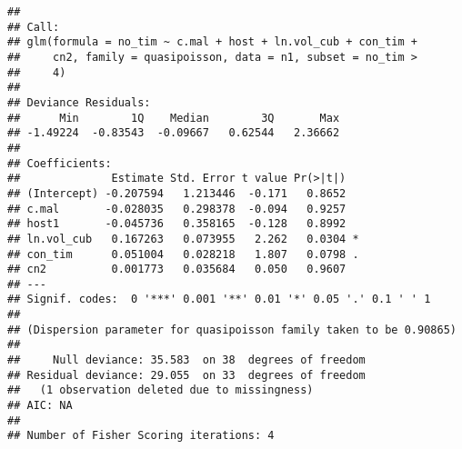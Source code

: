 \documentclass[]{article}
\newenvironment{Shaded}{\begin{snugshade}}{\end{snugshade}}
\newcommand{\KeywordTok}[1]{\textcolor[rgb]{0.13,0.29,0.53}{\textbf{#1}}}
\newcommand{\DataTypeTok}[1]{\textcolor[rgb]{0.13,0.29,0.53}{#1}}
\newcommand{\DecValTok}[1]{\textcolor[rgb]{0.00,0.00,0.81}{#1}}
\newcommand{\FloatTok}[1]{\textcolor[rgb]{0.00,0.00,0.81}{#1}}
\newcommand{\StringTok}[1]{\textcolor[rgb]{0.31,0.60,0.02}{#1}}
\newcommand{\CommentTok}[1]{\textcolor[rgb]{0.56,0.35,0.01}{\textit{#1}}}
\newcommand{\OperatorTok}[1]{\textcolor[rgb]{0.81,0.36,0.00}{\textbf{#1}}}
\newcommand{\NormalTok}[1]{#1}
\begin{document}
\begin{Shaded}
\end{Shaded}

\begin{verbatim}
## 
## Call:
## glm(formula = no_tim ~ c.mal + host + ln.vol_cub + con_tim + 
##     cn2, family = quasipoisson, data = n1, subset = no_tim > 
##     4)
## 
## Deviance Residuals: 
##      Min        1Q    Median        3Q       Max  
## -1.49224  -0.83543  -0.09667   0.62544   2.36662  
## 
## Coefficients:
##              Estimate Std. Error t value Pr(>|t|)  
## (Intercept) -0.207594   1.213446  -0.171   0.8652  
## c.mal       -0.028035   0.298378  -0.094   0.9257  
## host1       -0.045736   0.358165  -0.128   0.8992  
## ln.vol_cub   0.167263   0.073955   2.262   0.0304 *
## con_tim      0.051004   0.028218   1.807   0.0798 .
## cn2          0.001773   0.035684   0.050   0.9607  
## ---
## Signif. codes:  0 '***' 0.001 '**' 0.01 '*' 0.05 '.' 0.1 ' ' 1
## 
## (Dispersion parameter for quasipoisson family taken to be 0.90865)
## 
##     Null deviance: 35.583  on 38  degrees of freedom
## Residual deviance: 29.055  on 33  degrees of freedom
##   (1 observation deleted due to missingness)
## AIC: NA
## 
## Number of Fisher Scoring iterations: 4
\end{verbatim}
\end{document}
